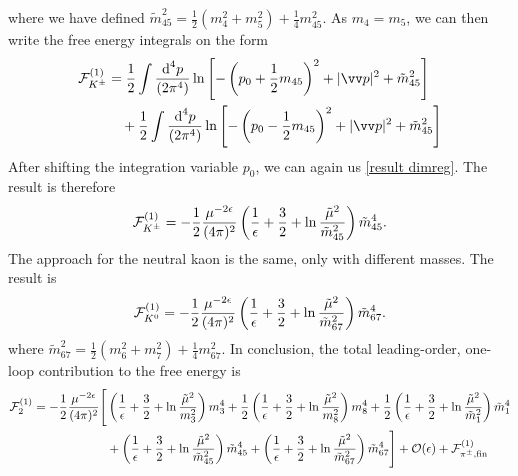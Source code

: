 %
where we have defined 
$
\tilde m_{45}^2 = \frac{1}{2}(m_4^2 + m_5^2) + \frac{1}{4} m_{45}^2.
$
As $m_4 = m_5$, we can then write the free energy integrals on the form
%
\begin{align}
    \nonumber
    \Eff_\Kpm^{(1)}
    &=
    \frac{1}{2} \int \frac{\dd^4 p}{(2\pi^4)}
    \ln \left[
        - \left(p_0 + \frac{1}{2}m_{45}\right)^2 
        + |\vv p|^2 
        + \tilde m_{45}^2 
    \right]\\
    &\quad+
    \frac{1}{2}
    \int \frac{\dd^4 p}{(2\pi^4)}
    \ln \left[
        - \left(p_0 - \frac{1}{2}m_{45}\right)^2 
        + |\vv p|^2 
        + \tilde m_{45}^2 
    \right]
\end{align}
%
After shifting the integration variable $p_0$, we can again us \autoref{result dimreg}.
The result is therefore
%
\begin{equation}
    \mathcal{F}_{K^\pm}^{(1)}
    =
    - \frac{1}{2} \frac{\mu^{-2 \epsilon} }{(4\pi)^2} 
    \left(
        \frac{1}{\epsilon} + \frac{3}{2} + \ln \frac{\tilde \mu^2}{\tilde m_{45}^2}
    \right)\tilde m_{45}^4.
\end{equation}
%
The approach for the neutral kaon is the same, only with different masses.
The result is
%
\begin{equation}
    \mathcal{F}_{K^0}^{(1)}
    =
    - \frac{1}{2} \frac{ \mu^{-2 \epsilon}}{(4\pi)^2} 
    \left(
        \frac{1}{\epsilon} + \frac{3}{2} + \ln \frac{\tilde \mu^2}{\tilde m_{67}^2}
    \right)\tilde m_{67}^4.
\end{equation}
%
where
$
\tilde m_{67}^2 = \frac{1}{2}(m_6^2 + m_7^2) + \frac{1}{4} m_{67}^2.
$
In conclusion, the total leading-order, one-loop contribution to the free energy is
%
\begin{align}
    \label{one-loop free energy}
    \nonumber
    \mathcal{F}^{(1)}_2
    =
    -\frac{1}{2} \frac{  \mu^{-2\epsilon}}{(4 \pi)^2} 
    \Bigg[&
        \left(
            \frac{1}{\epsilon} + \frac{3}{2} + \ln\frac{\tilde \mu^2}{m_3^2}
        \right)
        m_3^4
        +
        \frac{1}{2}
        \left(
            \frac{1}{\epsilon} + \frac{3}{2} + \ln\frac{\tilde \mu^2}{m_8^2} 
        \right)
        m_8^4+
        \frac{1}{2}
        \left(
            \frac{1}{\epsilon} + \frac{3}{2} + \ln\frac{\tilde \mu^2}{\tilde m_1^2}
        \right)
        \tilde m_1^4 \\ \nonumber
        & +
        \left(
            \frac{1}{\epsilon} + \frac{3}{2} + \ln\frac{\tilde \mu^2}{\tilde m_{45}^2}
        \right)
        \tilde m_{45}^4
        +
        \left(
            \frac{1}{\epsilon} + \frac{3}{2} + \ln\frac{\tilde \mu^2}{\tilde m_{67}^2} 
        \right)
        \tilde m_{67}^4
    \Bigg]
    + \mathcal O(\epsilon)
    + \mathcal{F}^{(1)}_{{\pi^\pm},\text{fin}}
\end{align}





